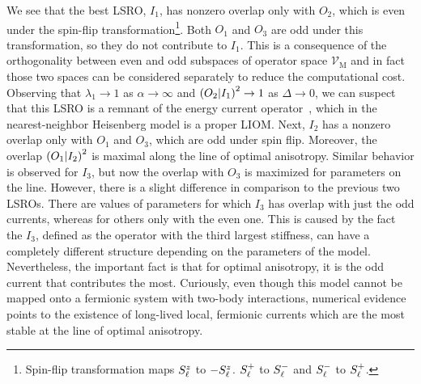 We see that the best LSRO, \(I_1\), has nonzero overlap only with \(O_2\), which is even under the
spin-flip transformation\footnote{Spin-flip transformation maps \(S^{z}_{\ell}\) to \(-S^{z}_{\ell}\).
\(S^{+}_{\ell}\) to \(S^{-}_{\ell}\) and \(S^{-}_{\ell}\) to \(S^{+}_{\ell}\).}.
Both \(O_1\) and \(O_3\) are odd under this transformation, so they do not contribute to \(I_1\).
This is a consequence of the orthogonality between even and odd subspaces of operator space \(\mathcal{V}_{\textrm{M}}\)
and in fact those two spaces can be considered separately to reduce the computational cost.
Observing that \(\lambda_1 \to 1\) as \(\alpha \to \infty\) and \(\left(O_2 \middle| I_1\right)^2 \to 1\) as
\(\Delta\to 0\), we can suspect that this LSRO is a remnant of the energy current operator~\autocite{Zotos1997},
which in the nearest-neighbor Heisenberg model is a proper LIOM.
Next, \(I_2\) has a nonzero overlap only with \(O_1\) and \(O_3\), which are odd under spin flip.
Moreover, the overlap \(\left(O_1 \middle| I_2\right)^2\) is maximal along the line of optimal anisotropy.
Similar behavior is observed for \(I_3\), but now the overlap with \(O_3\) is maximized for parameters
on the line. However, there is a slight difference in comparison to the previous two LSROs. There are
values of parameters for which \(I_3\) has overlap with just the odd currents, whereas for others
only with the even one. This is caused by the fact the \(I_3\), defined as the operator with
the third largest stiffness, can have a completely different structure depending on the parameters of 
the model. Nevertheless, the important fact is that for optimal anisotropy, it is the odd
current that contributes the most. Curiously, even though this model cannot be mapped
onto a fermionic system with two-body interactions, numerical evidence points to the existence of long-lived
local, fermionic currents which are the most stable at the line of optimal anisotropy.

